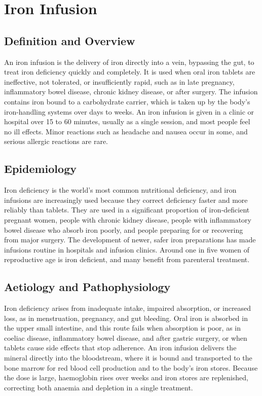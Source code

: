 \chapter{Iron Infusion}

\section*{Definition and Overview}
An iron infusion is the delivery of iron directly into a vein, bypassing the gut, to treat iron deficiency quickly and completely. It is used when oral iron tablets are ineffective, not tolerated, or insufficiently rapid, such as in late pregnancy, inflammatory bowel disease, chronic kidney disease, or after surgery. The infusion contains iron bound to a carbohydrate carrier, which is taken up by the body's iron-handling systems over days to weeks. An iron infusion is given in a clinic or hospital over 15 to 60 minutes, usually as a single session, and most people feel no ill effects. Minor reactions such as headache and nausea occur in some, and serious allergic reactions are rare.

\section*{Epidemiology}
Iron deficiency is the world's most common nutritional deficiency, and iron infusions are increasingly used because they correct deficiency faster and more reliably than tablets. They are used in a significant proportion of iron-deficient pregnant women, people with chronic kidney disease, people with inflammatory bowel disease who absorb iron poorly, and people preparing for or recovering from major surgery. The development of newer, safer iron preparations has made infusions routine in hospitals and infusion clinics. Around one in five women of reproductive age is iron deficient, and many benefit from parenteral treatment.

\section*{Aetiology and Pathophysiology}
Iron deficiency arises from inadequate intake, impaired absorption, or increased loss, as in menstruation, pregnancy, and gut bleeding. Oral iron is absorbed in the upper small intestine, and this route fails when absorption is poor, as in coeliac disease, inflammatory bowel disease, and after gastric surgery, or when tablets cause side effects that stop adherence. An iron infusion delivers the mineral directly into the bloodstream, where it is bound and transported to the bone marrow for red blood cell production and to the body's iron stores. Because the dose is large, haemoglobin rises over weeks and iron stores are replenished, correcting both anaemia and depletion in a single treatment.

